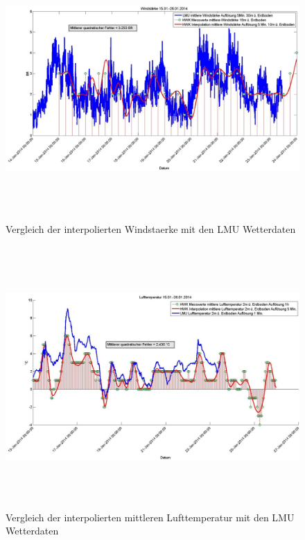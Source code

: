 \begin{figure}
\centering
\includegraphics[width=16cm,height=10cm]{analyse/windstaerke2}
\caption{Vergleich der interpolierten Windstaerke mit den LMU Wetterdaten}
\label{fig:windstaerke}
\end{figure}
\begin{figure}
\centering
\includegraphics[width=16cm,height=10cm]{analyse/mittlufttemp2}
\caption{Vergleich der interpolierten mittleren Lufttemperatur mit den LMU Wetterdaten}
\label{fig:mittlufttemp}
\end{figure}
